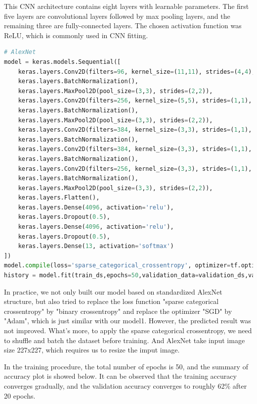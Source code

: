  This CNN architecture contains eight layers with learnable parameters. The first five layers are convolutional layers followed by max pooling layers, and the remaining three are fully-connected layers. The chosen activation function was ReLU, which is commonly used in CNN fitting.
 
\begin{lstlisting}[language=python]
# AlexNet
model = keras.models.Sequential([
    keras.layers.Conv2D(filters=96, kernel_size=(11,11), strides=(4,4), activation='relu', input_shape=(160,160,3)),
    keras.layers.BatchNormalization(),
    keras.layers.MaxPool2D(pool_size=(3,3), strides=(2,2)),
    keras.layers.Conv2D(filters=256, kernel_size=(5,5), strides=(1,1), activation='relu', padding="same"),
    keras.layers.BatchNormalization(),
    keras.layers.MaxPool2D(pool_size=(3,3), strides=(2,2)),
    keras.layers.Conv2D(filters=384, kernel_size=(3,3), strides=(1,1), activation='relu', padding="same"),
    keras.layers.BatchNormalization(),
    keras.layers.Conv2D(filters=384, kernel_size=(3,3), strides=(1,1), activation='relu', padding="same"),
    keras.layers.BatchNormalization(),
    keras.layers.Conv2D(filters=256, kernel_size=(3,3), strides=(1,1), activation='relu', padding="same"),
    keras.layers.BatchNormalization(),
    keras.layers.MaxPool2D(pool_size=(3,3), strides=(2,2)),
    keras.layers.Flatten(),
    keras.layers.Dense(4096, activation='relu'),
    keras.layers.Dropout(0.5),
    keras.layers.Dense(4096, activation='relu'),
    keras.layers.Dropout(0.5),
    keras.layers.Dense(13, activation='softmax')
])
model.compile(loss='sparse_categorical_crossentropy', optimizer=tf.optimizers.SGD(lr=0.001), metrics=['accuracy'])
history = model.fit(train_ds,epochs=50,validation_data=validation_ds,validation_freq=1,callbacks=[tensorboard_cb])

\end{lstlisting}
\vspace{-0.6cm}

In practice, we not only built our model based on standardized AlexNet structure, but also tried to replace the loss function "sparse categorical crossentropy" by "binary crossentropy" and replace the optimizer "SGD" by "Adam", which is just similar with our model1. However, the predicted result was not improved. What's more, to apply the sparse categorical crossentropy, we need to shuffle and batch the dataset before training. And AlexNet take input image size 227x227, which requires us to resize the imput image.

In the training procedure, the total number of epochs is 50, and the summary of accuracy plot is showed below. It can be observed that the training accuracy converges gradually, and the validation accuracy converges to roughly 62\% after 20 epochs.


